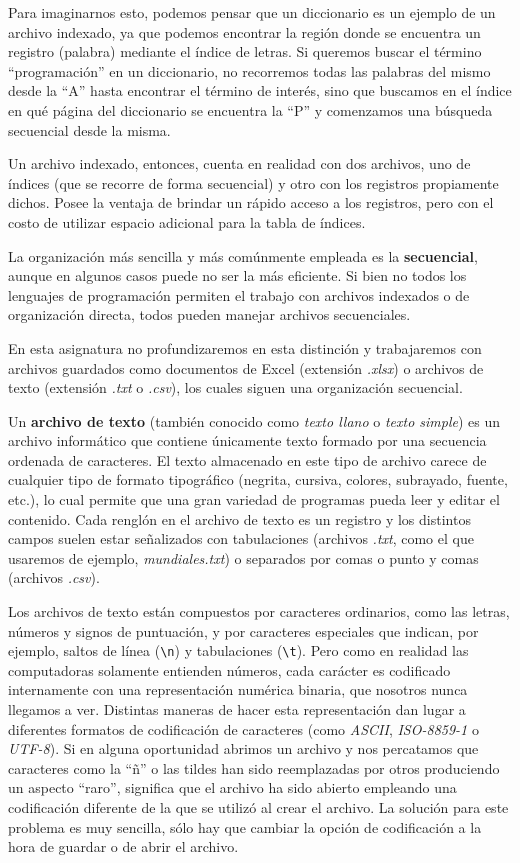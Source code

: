 \documentclass[
]{book}
\begin{document}
\begin{itemize}
  Para imaginarnos esto, podemos pensar que un diccionario es un ejemplo de un archivo indexado, ya que podemos encontrar la región donde se encuentra un registro (palabra) mediante el índice de letras. Si queremos buscar el término ``programación'' en un diccionario, no recorremos todas las palabras del mismo desde la ``A'' hasta encontrar el término de interés, sino que buscamos en el índice en qué página del diccionario se encuentra la ``P'' y comenzamos una búsqueda secuencial desde la misma.

  Un archivo indexado, entonces, cuenta en realidad con dos archivos, uno de índices (que se recorre de forma secuencial) y otro con los registros propiamente dichos. Posee la ventaja de brindar un rápido acceso a los registros, pero con el costo de utilizar espacio adicional para la tabla de índices.
\end{itemize}

La organización más sencilla y más comúnmente empleada es la \textbf{secuencial}, aunque en algunos casos puede no ser la más eficiente. Si bien no todos los lenguajes de programación permiten el trabajo con archivos indexados o de organización directa, todos pueden manejar archivos secuenciales.

En esta asignatura no profundizaremos en esta distinción y trabajaremos con archivos guardados como documentos de Excel (extensión \emph{.xlsx}) o archivos de texto (extensión \emph{.txt} o \emph{.csv}), los cuales siguen una organización secuencial.

Un \textbf{archivo de texto} (también conocido como \emph{texto llano} o \emph{texto simple}) es un archivo informático que contiene únicamente texto formado por una secuencia ordenada de caracteres. El texto almacenado en este tipo de archivo carece de cualquier tipo de formato tipográfico (negrita, cursiva, colores, subrayado, fuente, etc.), lo cual permite que una gran variedad de programas pueda leer y editar el contenido. Cada renglón en el archivo de texto es un registro y los distintos campos suelen estar señalizados con tabulaciones (archivos \emph{.txt}, como el que usaremos de ejemplo, \emph{mundiales.txt}) o separados por comas o punto y comas (archivos \emph{.csv}).

Los archivos de texto están compuestos por caracteres ordinarios, como las letras, números y signos de puntuación, y por caracteres especiales que indican, por ejemplo, saltos de línea (\texttt{\textbackslash{}n}) y tabulaciones (\texttt{\textbackslash{}t}). Pero como en realidad las computadoras solamente entienden números, cada carácter es codificado internamente con una representación numérica binaria, que nosotros nunca llegamos a ver. Distintas maneras de hacer esta representación dan lugar a diferentes formatos de codificación de caracteres (como \emph{ASCII}, \emph{ISO-8859-1} o \emph{UTF-8}). Si en alguna oportunidad abrimos un archivo y nos percatamos que caracteres como la ``ñ'' o las tildes han sido reemplazadas por otros produciendo un aspecto ``raro'', significa que el archivo ha sido abierto empleando una codificación diferente de la que se utilizó al crear el archivo. La solución para este problema es muy sencilla, sólo hay que cambiar la opción de codificación a la hora de guardar o de abrir el archivo.
\end{document}
